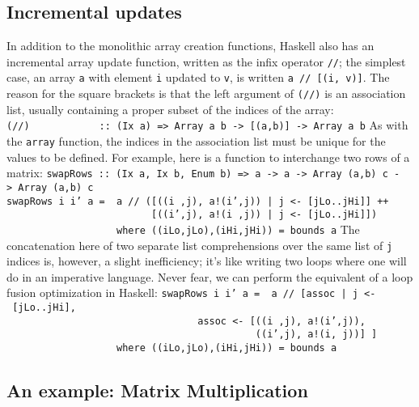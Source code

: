\subsection{Incremental updates}
In addition to the monolithic array creation functions, Haskell also
has an incremental array update function, written as the infix
operator \mbox{\tt //}; the simplest case, an array \mbox{\tt a} with element \mbox{\tt i}
updated to \mbox{\tt v}, is written \mbox{\tt a\ //\ [(i,\ v)]}.  The reason for the square
brackets is that the left argument of \mbox{\tt (//)} is an association list,
usually containing a proper subset of the indices of the array:
\bprog
\mbox{\tt (//)\ \ \ \ \ \ \ \ \ \ \ \ ::\ (Ix\ a)\ =>\ Array\ a\ b\ ->\ [(a,b)]\ ->\ Array\ a\ b}
\eprog
As with the \mbox{\tt array} function, the indices in the association list
must be unique for the values to be defined.  For example, here
is a function to interchange two rows of a matrix:
\bprog
\mbox{\tt swapRows\ ::\ (Ix\ a,\ Ix\ b,\ Enum\ b)\ =>\ a\ ->\ a\ ->\ Array\ (a,b)\ c\ ->\ Array\ (a,b)\ c}\\
\mbox{\tt swapRows\ i\ i'\ a\ =\ \ a\ //\ ([((i\ ,j),\ a!(i',j))\ |\ j\ <-\ [jLo..jHi]]\ ++}\\
\mbox{\tt \ \ \ \ \ \ \ \ \ \ \ \ \ \ \ \ \ \ \ \ \ \ \ \ \ [((i',j),\ a!(i\ ,j))\ |\ j\ <-\ [jLo..jHi]])}\\
\mbox{\tt \ \ \ \ \ \ \ \ \ \ \ \ \ \ \ \ \ \ \ where\ ((iLo,jLo),(iHi,jHi))\ =\ bounds\ a}
\eprog
The concatenation here of two separate list comprehensions over the same
list of \mbox{\tt j} indices is, however, a slight inefficiency; it's like
writing two loops where one will do in an imperative language.
Never fear, we can perform the equivalent of a loop fusion optimization
in Haskell:
\bprog
\mbox{\tt swapRows\ i\ i'\ a\ =\ \ a\ //\ [assoc\ |\ j\ <-\ [jLo..jHi],}\\
\mbox{\tt \ \ \ \ \ \ \ \ \ \ \ \ \ \ \ \ \ \ \ \ \ \ \ \ \ \ \ \ \ \ \ \ \ assoc\ <-\ [((i\ ,j),\ a!(i',j)),}\\
\mbox{\tt \ \ \ \ \ \ \ \ \ \ \ \ \ \ \ \ \ \ \ \ \ \ \ \ \ \ \ \ \ \ \ \ \ \ \ \ \ \ \ \ \ \ \ ((i',j),\ a!(i,\ j))]\ ]}\\
\mbox{\tt \ \ \ \ \ \ \ \ \ \ \ \ \ \ \ \ \ \ \ where\ ((iLo,jLo),(iHi,jHi))\ =\ bounds\ a}
\eprog

\subsection{An example: Matrix Multiplication}

